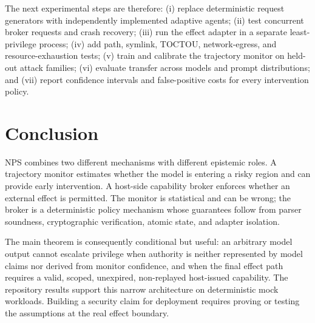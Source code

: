 \documentclass[11pt]{article}
\newcommand{\1}{\mathbf{1}}
\begin{document}
The next experimental steps are therefore: (i) replace deterministic request generators with independently implemented adaptive agents; (ii) test concurrent broker requests and crash recovery; (iii) run the effect adapter in a separate least-privilege process; (iv) add path, symlink, TOCTOU, network-egress, and resource-exhaustion tests; (v) train and calibrate the trajectory monitor on held-out attack families; (vi) evaluate transfer across models and prompt distributions; and (vii) report confidence intervals and false-positive costs for every intervention policy.

\section{Conclusion}

NPS combines two different mechanisms with different epistemic roles. A trajectory monitor estimates whether the model is entering a risky region and can provide early intervention. A host-side capability broker enforces whether an external effect is permitted. The monitor is statistical and can be wrong; the broker is a deterministic policy mechanism whose guarantees follow from parser soundness, cryptographic verification, atomic state, and adapter isolation.

The main theorem is consequently conditional but useful: an arbitrary model output cannot escalate privilege when authority is neither represented by model claims nor derived from monitor confidence, and when the final effect path requires a valid, scoped, unexpired, non-replayed host-issued capability. The repository results support this narrow architecture on deterministic mock workloads. Building a security claim for deployment requires proving or testing the assumptions at the real effect boundary.
\end{document}
